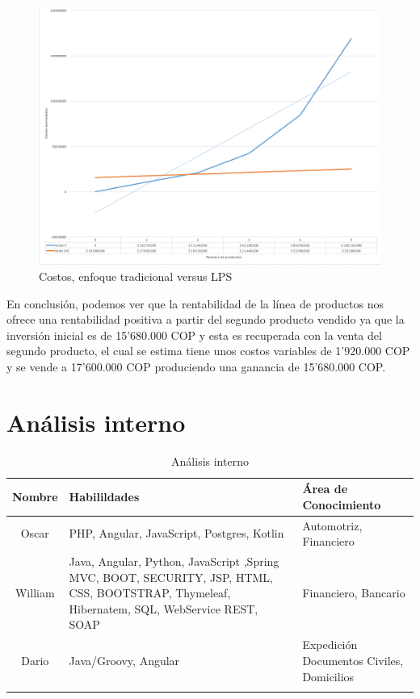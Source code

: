 \documentclass[10pt,a4paper,openany]{book}
\begin{document}
\begin{figure}[h]
	\centering
	\includegraphics[width=1\textwidth]{grf1}
	\caption{Costos, enfoque tradicional versus LPS}
	\label{fig:grf1}
\end{figure} 

En conclusión, podemos ver que la rentabilidad de la línea de productos nos ofrece una rentabilidad positiva a partir del segundo producto vendido ya que la inversión inicial es de 15’680.000 COP y esta es recuperada con la venta del segundo producto, el cual se estima tiene unos costos variables de 1’920.000 COP y se vende a 17’600.000 COP produciendo una ganancia de 15’680.000 COP. 


\section{Análisis interno}

\begin{longtable}{|c|p{8cm}|p{4cm}|} \hline
 Nombre & Habilildades  & Área de Conocimiento \\[0.5ex] \hline
 Oscar & PHP, Angular, JavaScript, Postgres, Kotlin   & Automotriz, Financiero \\[0.5ex] \hline
 William & Java, Angular, Python, JavaScript ,Spring MVC, BOOT, SECURITY, JSP, HTML, CSS, BOOTSTRAP, Thymeleaf, Hibernatem, SQL, WebService REST, SOAP   & Financiero, Bancario \\[0.5ex] \hline
 Dario & Java/Groovy, Angular   & Expedición Documentos Civiles, Domicilios \\[0.5ex] \hline
\caption{Análisis interno}
\label{table:t4}
\end{longtable}
\end{document}

